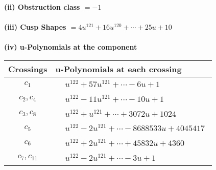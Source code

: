 \documentclass[1p]{elsarticle_modified}
\theoremstyle{definition}
\begin{document}
\flushleft \textbf{(ii) Obstruction class $= -1$}\\~\\
\flushleft \textbf{(iii) Cusp Shapes $= 4 u^{121}+16 u^{120}+\cdots+25 u+10$}\\~\\
\newpage\renewcommand{\arraystretch}{1}
\flushleft \textbf{(iv) u-Polynomials at the component}\newline \\
\begin{tabular}{m{50pt}|m{274pt}}
Crossings & \hspace{64pt}u-Polynomials at each crossing \\
\hline $$\begin{aligned}c_{1}\end{aligned}$$&$\begin{aligned}
&u^{122}+57 u^{121}+\cdots-6 u+1
\end{aligned}$\\
\hline $$\begin{aligned}c_{2},c_{4}\end{aligned}$$&$\begin{aligned}
&u^{122}-11 u^{121}+\cdots-10 u+1
\end{aligned}$\\
\hline $$\begin{aligned}c_{3},c_{8}\end{aligned}$$&$\begin{aligned}
&u^{122}+u^{121}+\cdots+3072 u+1024
\end{aligned}$\\
\hline $$\begin{aligned}c_{5}\end{aligned}$$&$\begin{aligned}
&u^{122}-2 u^{121}+\cdots-8688533 u+4045417
\end{aligned}$\\
\hline $$\begin{aligned}c_{6}\end{aligned}$$&$\begin{aligned}
&u^{122}+2 u^{121}+\cdots+45832 u+4360
\end{aligned}$\\
\hline $$\begin{aligned}c_{7},c_{11}\end{aligned}$$&$\begin{aligned}
&u^{122}-2 u^{121}+\cdots-3 u+1
\end{aligned}$\\

\end{tabular}
\end{document}

